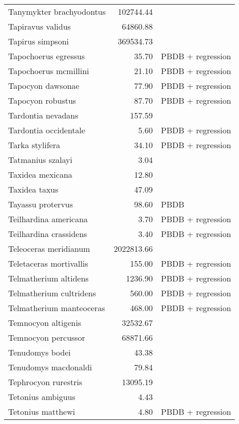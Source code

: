 \begin{table}[ht]
\begin{tabular}{lrl}
  Tanymykter brachyodontus & 102744.44 & \cite{Tomiya2013} \\ 
  Tapiravus validus & 64860.88 & \cite{Tomiya2013} \\ 
  Tapirus simpsoni & 369534.73 & \cite{Tomiya2013} \\ 
  Tapochoerus egressus & 35.70 & PBDB + regression \\ 
  Tapochoerus mcmillini & 21.10 & PBDB + regression \\ 
  Tapocyon dawsonae & 77.90 & PBDB + regression \\ 
  Tapocyon robustus & 87.70 & PBDB + regression \\ 
  Tardontia nevadans & 157.59 & \cite{Tomiya2013} \\ 
  Tardontia occidentale & 5.60 & PBDB + regression \\ 
  Tarka stylifera & 34.10 & PBDB + regression \\ 
  Tatmanius szalayi & 3.04 & \cite{Ferrusquia-Villafranca2006} \\ 
  Taxidea mexicana & 12.80 & \cite{Bloch2007} \\ 
  Taxidea taxus & 47.09 & \cite{Smith2004} \\ 
  Tayassu protervus & 98.60 & PBDB \\ 
  Teilhardina americana & 3.70 & PBDB + regression \\ 
  Teilhardina crassidens & 3.40 & PBDB + regression \\ 
  Teleoceras meridianum & 2022813.66 & \cite{Tomiya2013} \\ 
  Teletaceras mortivallis & 155.00 & PBDB + regression \\ 
  Telmatherium altidens & 1236.90 & PBDB + regression \\ 
  Telmatherium cultridens & 560.00 & PBDB + regression \\ 
  Telmatherium manteoceras & 468.00 & PBDB + regression \\ 
  Temnocyon altigenis & 32532.67 & \cite{Tomiya2013} \\ 
  Temnocyon percussor & 68871.66 & \cite{Tomiya2013} \\ 
  Tenudomys bodei & 43.38 & \cite{Tomiya2013} \\ 
  Tenudomys macdonaldi & 79.84 & \cite{Tomiya2013} \\ 
  Tephrocyon rurestris & 13095.19 & \cite{Tomiya2013} \\ 
  Tetonius ambiguus & 4.43 & \cite{Brown1980} \\ 
  Tetonius matthewi & 4.80 & PBDB + regression \\ 

\end{tabular}
\end{table}
